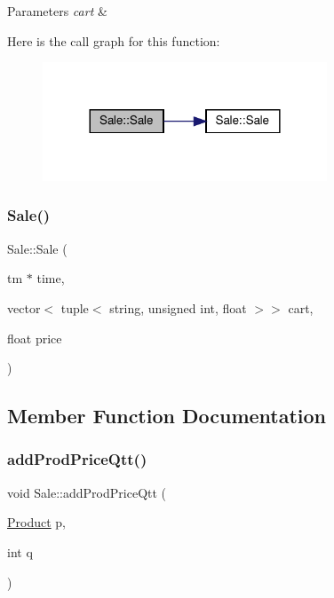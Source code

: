 \begin{DoxyParams}{Parameters}
{\em cart} & \\
\hline
\end{DoxyParams}
Here is the call graph for this function\+:\nopagebreak
\begin{figure}[H]
\begin{center}
\leavevmode
\includegraphics[width=240pt]{classSale_a69f5e59b612e42837898b951ea08c3b7_cgraph}
\end{center}
\end{figure}
\mbox{\label{classSale_ac832a81dfbb1a6130c4b50675c5533db}} 
\subsubsection{\texorpdfstring{Sale()}{Sale()}\hspace{0.1cm}{\footnotesize\ttfamily [3/3]}}
{\footnotesize\ttfamily Sale\+::\+Sale (\begin{DoxyParamCaption}\item[{tm $\ast$}]{time,  }\item[{vector$<$ tuple$<$ string, unsigned int, float $>$$>$}]{cart,  }\item[{float}]{price }\end{DoxyParamCaption})}



\subsection{Member Function Documentation}
\mbox{\label{classSale_ad582ae56bc2aa780b428e31de213a192}} 
\subsubsection{\texorpdfstring{add\+Prod\+Price\+Qtt()}{addProdPriceQtt()}}
{\footnotesize\ttfamily void Sale\+::add\+Prod\+Price\+Qtt (\begin{DoxyParamCaption}\item[{\hyperlink{classProduct}{Product}}]{p,  }\item[{int}]{q }\end{DoxyParamCaption})}


